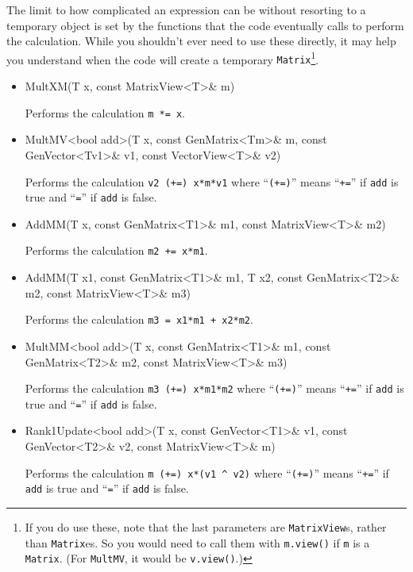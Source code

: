 \documentclass[twoside,letterpaper,11pt]{article}
\renewcommand{\tt}[1]{{\lstinline {#1}}}
\begin{document}
The limit to how complicated an expression can be without resorting to a temporary object
is set by the 
functions that the code eventually calls to perform the calculation.  
While you shouldn't ever
need to use these directly, it may help you understand when the code will create a
temporary \tt{Matrix}\footnote{If you do use these, note that the last parameters are
\tt{MatrixView}s, rather than \tt{Matrix}es.  So you would need to 
call them with \tt{m.view()} if \tt{m} is a \tt{Matrix}.  (For \tt{MultMV},
it would be \tt{v.view()}.)}.

\begin{itemize}

\item
\begin{tmvcode}
MultXM(T x, const MatrixView<T>& m)
\end{tmvcode}
Performs the calculation \tt{m *= x}.

\item
\begin{tmvcode}
MultMV<bool add>(T x, const GenMatrix<Tm>& m, 
      const GenVector<Tv1>& v1, const VectorView<T>& v2)
\end{tmvcode}
Performs the calculation \tt{v2 (+=) x*m*v1} 
where ``\tt{(+=)}'' means ``\tt{+=}'' 
if \tt{add} is true and ``\tt{=}'' if \tt{add} is false.

\item
\begin{tmvcode}
AddMM(T x, const GenMatrix<T1>& m1, const MatrixView<T>& m2)
\end{tmvcode}
Performs the calculation \tt{m2 += x*m1}.

\item
\begin{tmvcode}
AddMM(T x1, const GenMatrix<T1>& m1, T x2, const GenMatrix<T2>& m2,
      const MatrixView<T>& m3)
\end{tmvcode}
Performs the calculation \tt{m3 = x1*m1 + x2*m2}.

\item
\begin{tmvcode}
MultMM<bool add>(T x, const GenMatrix<T1>& m1, 
      const GenMatrix<T2>& m2, const MatrixView<T>& m3)
\end{tmvcode}
Performs the calculation \tt{m3 (+=) x*m1*m2} 
where ``\tt{(+=)}'' means ``\tt{+=}'' 
if \tt{add} is true and ``\tt{=}'' if \tt{add} is false.

\item
\begin{tmvcode}
Rank1Update<bool add>(T x, const GenVector<T1>& v1, 
      const GenVector<T2>& v2, const MatrixView<T>& m)
\end{tmvcode}
Performs the calculation 
\tt{m (+=) x*(v1 ^ v2)} 
where ``\tt{(+=)}'' means ``\tt{+=}'' 
if \tt{add} is true and ``\tt{=}'' if \tt{add} is false.

\end{itemize}
\end{document}
